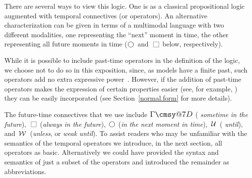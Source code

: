 \documentclass[nohyperref]{acmtrans2f}
\makeatletter
\def\sometime{\mathord{\hbox{\large$\mathchar"0\cmsy@7D$}}}
\newcommand{\always}{\raisebox{-.2ex}{
                           \mbox{\unitlength=0.9ex
                           \begin{picture}(2,2)
                           \linethickness{0.06ex}
                           \put(0,0){\line(1,0){2}}
                           \put(0,2){\line(1,0){2}}
                           \put(0,0){\line(0,1){2}}
                           \put(2,0){\line(0,1){2}}
                           \end{picture}}}
                          \,}
\newcommand{\next}{\!\raisebox{-.2ex}{ %
                        \mbox{\unitlength=0.9ex
                        \begin{picture}(2,2)
                        \linethickness{0.06ex}
                        \put(1,1){\circle{2}} %
                        \end{picture}}}       %
                        \,}
\def\until{\hbox{$\,\cal U \,$}}
\def\unless{\hbox{$\,\cal W \,$}}
\makeatother
\begin{document}
There are several ways to view this logic. One is as a classical
propositional logic augmented with temporal connectives (or
operators). An alternative characterization can be given in terms of a
multimodal language with two different modalities, one representing
the ``next'' moment in time, the other representing all future moments
in time ($\next$ and $\always$ below, respectively).

While it is possible to include past-time operators in the definition
of the logic, we choose not to do so in this exposition, since, as
models have a finite past, such operators add no extra expressive
power~\cite{GPSS80,LPZ85}. However, if the addition of past-time operators
makes the expression of certain properties easier (see, for example,
) they can be easily incorporated (see Section~\ref{normal.form}
for more details).

The future-time connectives that we use include $\sometime$ ({\em
sometime in the future}), $\always$ ({\em always in the future}),
$\next$ ({\em in the next moment in time}), $\until$ ({\em
until}), and $\unless$ ({\em unless}, or {\em weak until}). To
assist readers who may be unfamiliar with the semantics of the
temporal operators we introduce, in the next section, all operators as
basic. Alternatively we could have provided the syntax and semantics
of just a subset of the operators and introduced the remainder as
abbreviations.
\end{document}
